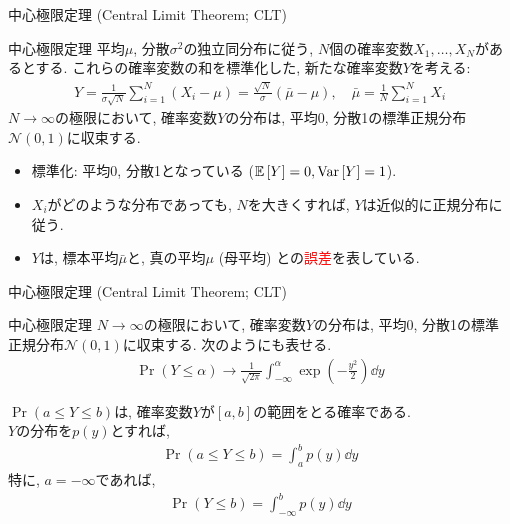 \documentclass[dvipdfmx,notheorems,t]{beamer}
\begin{document}
\begin{frame}{中心極限定理 (Central Limit Theorem; CLT)}
\begin{block}{中心極限定理}
  平均$\mu$, 分散$\sigma^2$の独立同分布に従う, $N$個の確率変数$X_1, \ldots, X_N$があるとする.
  これらの確率変数の和を標準化した, 新たな確率変数$Y$を考える:
  \begin{align*}
    Y = \frac{1}{\sigma \sqrt{N}} \sum_{i = 1}^N \left( X_i - \mu \right)
      = \frac{\sqrt{N}}{\sigma} \left( \bar{\mu} - \mu \right), \quad
    \bar{\mu} = \frac{1}{N} \sum_{i = 1}^N X_i
  \end{align*}
  $N \to \infty$の極限において, 確率変数$Y$の分布は, 平均0, 分散1の標準正規分布$\mathcal{N}(0, 1)$に収束する.
\end{block}

\begin{itemize}
  \item 標準化: 平均0, 分散1となっている ($\operatorname{\mathbb{E}} \left[ Y \right] = 0, \operatorname{Var} \left[ Y \right] = 1$).
  \item $X_i$がどのような分布であっても, $N$を大きくすれば, $Y$は近似的に正規分布に従う.
  \item $Y$は, 標本平均$\bar{\mu}$と, 真の平均$\mu$ (母平均) との\textcolor{red}{誤差}を表している.
\end{itemize}
\end{frame}

\begin{frame}{中心極限定理 (Central Limit Theorem; CLT)}
\begin{block}{中心極限定理}
  $N \to \infty$の極限において, 確率変数$Y$の分布は, 平均0, 分散1の標準正規分布$\mathcal{N}(0, 1)$に収束する.
  次のようにも表せる.
  \begin{align*}
    \Pr(Y \le \alpha) \to \frac{1}{\sqrt{2\pi}} \int_{-\infty}^\alpha \exp(-\frac{y^2}{2}) \dd{y}
  \end{align*}
\end{block}

$\Pr(a \le Y \le b)$は, 確率変数$Y$が$\left[ a, b \right]$の範囲をとる確率である. \\
$Y$の分布を$p(y)$とすれば,
\begin{align*}
  \Pr(a \le Y \le b) = \int_a^b p(y) \dd{y}
\end{align*}
特に, $a = -\infty$であれば,
\begin{align*}
  \Pr(Y \le b) = \int_{-\infty}^b p(y) \dd{y}
\end{align*}
\end{frame}
\end{document}
